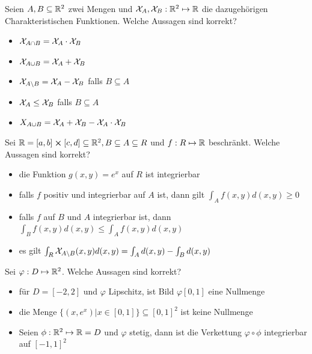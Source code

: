 \hrulefill

Seien $A, B \subseteq \mathbb{R}^2$ zwei Mengen und $\mathcal{X}_A, \mathcal{X}_B: \mathbb{R}^2 \mapsto \mathbb{R}$ die dazugehörigen
Charakteristischen Funktionen. Welche Aussagen sind korrekt?
\begin{itemize}
    \item[\rlap{\raisebox{0.3ex}{\hspace{0.4ex}\tiny \ding{52}}}$\square$] $\mathcal{X}_{A \cap B} =
    \mathcal{X}_A \cdot \mathcal{X}_B$
    \item[$\square$] $\mathcal{X}_{A \cup B} = \mathcal{X}_A + \mathcal{X}_B$
    \item[\rlap{\raisebox{0.3ex}{\hspace{0.4ex}\tiny \ding{52}}}$\square$] $\mathcal{X}_{A 
    \backslash B} = \mathcal{X}_A - \mathcal{X}_B$ falls $B \subseteq A$
    \item[$\square$] $\mathcal{X}_A \leq \mathcal{X}_B$ falls $B \subseteq A$
    \item[\rlap{\raisebox{0.3ex}{\hspace{0.4ex}\tiny \ding{52}}}$\square$] $X_{A \cup B} =
    \mathcal{X}_A + \mathcal{X}_B - \mathcal{X}_A \cdot \mathcal{X}_B$
\end{itemize}

\hrulefill

Sei $\mathbb{R} = [a,b] \cross [c,d] \subseteq \mathbb{R}^2, B \subseteq A \subseteq R$ und $f: R 
\mapsto \mathbb{R}$ beschränkt. Welche Aussagen sind korrekt?
\begin{itemize}
    \item[\rlap{\raisebox{0.3ex}{\hspace{0.4ex}\tiny \ding{52}}}$\square$] die Funktion 
    $g(x,y) = e^x$ auf $R$ ist integrierbar
    \item[\rlap{\raisebox{0.3ex}{\hspace{0.4ex}\tiny \ding{52}}}$\square$] falls $f$
    positiv und integrierbar auf $A$ ist, dann gilt $\int_A f(x,y) d(x,y) \geq 0$
    \item[$\square$] falls $f$ auf $B$ und $A$ integrierbar ist, dann $\int_B
    f(x,y)d(x,y) \leq \int_A f(x,y)d(x,y)$
    \item[\rlap{\raisebox{0.3ex}{\hspace{0.4ex}\tiny \ding{52}}}$\square$] es gilt
    $\int_R \mathcal{X}_{A \backslash B}(x,y)d(x,y) = \int_A d(x,y) - \int_B d(x,y)$
\end{itemize}

\hrulefill

Sei $\varphi: D \mapsto \mathbb{R}^2$. Welche Aussagen sind korrekt?
\begin{itemize}
    \item[\rlap{\raisebox{0.3ex}{\hspace{0.4ex}\tiny \ding{52}}}$\square$] für 
    $D = [-2, 2]$ und $\varphi$ Lipschitz, ist Bild $\varphi{[0,1]}$ eine Nullmenge
    \item[$\square$] die Menge $\{(x, e^x) | x \in [0,1]\} \subseteq [0,1]^2$ 
    ist keine Nullmenge
    \item[\rlap{\raisebox{0.3ex}{\hspace{0.4ex}\tiny \ding{52}}}$\square$] Seien
    $\phi: \mathbb{R}^2 \mapsto \mathbb{R} = D$ und $\varphi$ stetig, dann ist die 
    Verkettung $\varphi \circ \phi$ integrierbar auf $[-1, 1]^2$
\end{itemize}

